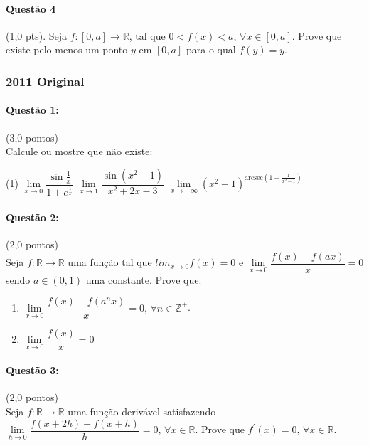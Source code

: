\documentclass[12pt,a4paper]{article}
\newcommand{\R}{\mathbb{R}}
\newcommand{\original}[1]{\tiny \href{#1}{Original} \normalsize}
\begin{document}
\paragraph{Questão 4} (1,0 pts). Seja $f: [0,a] \to \R$, tal que $0< f(x) < a,\, \forall x \in [0,a]$. Prove que existe pelo menos um ponto $y$ em $[0,a]$ para o qual $f(y) = y$.

\newpage

\subsubsection{2011  \original{https://drive.google.com/open?id=12Kp8xZQmZvnoQS_m-H4aGk_Uo2QkQlu3}}

\paragraph{Questão 1:} (3,0 pontos)\\
Calcule ou mostre que não existe:
\begin{tasks}(1)
\task $\lim\limits_{x\to 0} \dfrac{\sin \frac{1}{x}}{1+e^{\frac{1}{x}}}$
\task $\lim\limits_{x\to 1} \dfrac{\sin (x^2-1)}{x^2+2x-3}$
\task $\lim\limits_{x\to +\infty} (x^2-1)^{\mathrm{arcsec}\left(1+\frac{1}{x^2-1}\right)}$
\end{tasks}

\paragraph{Questão 2:} (2,0 pontos)\\
Seja $f: \R \to \R$ uma função tal que $lim_{x\to 0} f(x) = 0$ e $\lim\limits_{x\to 0}\dfrac{f(x) - f(ax)}{x} = 0$ sendo $a \in (0,1)$ uma constante. Prove que:

\begin{enumerate}[label=(\alph*)]
\item $\lim\limits_{x\to 0} \dfrac{f(x) - f(a^n x)}{x} = 0, \, \forall n \in \mathbb{Z}^+$.

\item $\lim\limits_{x\to 0} \dfrac{f(x)}{x} = 0$
\end{enumerate}

\paragraph{Questão 3:} (2,0 pontos)\\
Seja $f: \R \to \R$ uma função derivável satisfazendo $\lim\limits_{h\to 0} \dfrac{f(x+2h) - f(x+h)}{h} = 0,\, \forall x \in \R$. Prove que $f^{\prime}(x) = 0,\, \forall x \in \R$.
\end{document}
